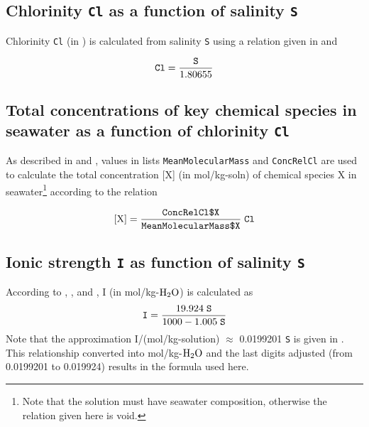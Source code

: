 \documentclass[a4paper]{article}
\begin{document}
\subsection{Chlorinity \texttt{Cl} as a function of salinity \texttt{S}}
Chlorinity \texttt{Cl} (in \permil) is calculated from salinity \texttt{S} using a relation given in \citet[chap. 5, p. 11]{DOE1994} and \citet[p. 100]{Zeebe2001}

\begin{equation}
\rm \mbox{\texttt{Cl}} = \frac{\mbox{\texttt{S}}}{1.80655}
\end{equation}

\subsection{Total concentrations of key chemical species in seawater as a function of chlorinity \texttt{Cl}}
As described in \citet[chap. 5, p. 11]{DOE1994} and \citet[chap. 5, p. 10]{Dickson2007}, values in lists \texttt{MeanMolecularMass} and \texttt{ConcRelCl} are used to calculate the total concentration [X] (in mol/kg-soln) of chemical species X in seawater\footnote{Note that the solution must have seawater composition, otherwise the relation given here is void.} according to the relation

\begin{equation}
\rm [X] = \frac{\mbox{\texttt{ConcRelCl\textdollar$ $X}}}{\mbox{\texttt{MeanMolecularMass\textdollar$ $X}}}\;\texttt{Cl}
\end{equation}

\subsection{Ionic strength \texttt{I} as function of salinity \texttt{S}}
According to \citet[chapter 5, p. 13, 15]{DOE1994},  \citet[ p.12]{Zeebe2001}, and \citet[ p.257]{Roy1993b}, I (in mol/kg-$\rm H_2O$) is calculated as
\begin{equation}
\rm \mbox{\texttt{I}} = \frac{19.924\;\mbox{\texttt{S}}}{1000-1.005\;\mbox{\texttt{S}}}
\end{equation}
Note that the approximation I/(mol/kg-solution) $\approx$ 0.0199201 \texttt{S} is given in \citet[  p. 428.]{Millero1982}.
This relationship converted into mol/kg-$\rm H_2O$ and the last digits adjusted (from 0.0199201 to 0.019924) results in the formula used here.\\
\end{document}
